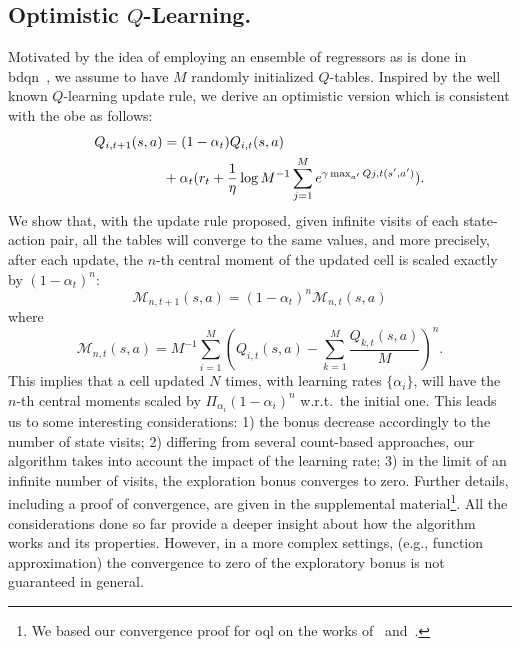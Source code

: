\subsection{Optimistic $Q$-Learning.}
Motivated by the idea of employing an ensemble of regressors as is done in \gls{bdqn}~\cite{osband2017deep}, we assume to have $M$ randomly initialized $Q$-tables. Inspired by the well known $Q$-learning update rule, we derive an optimistic version which is consistent with the \gls{obe} as follows:
\begin{align*}
      \small  Q_{i, t+1}(s,a) &= (1-\alpha_t)Q_{i,t}(s,a)  \nonumber  \\
  & \small + \alpha_t (r_t + \frac{1}{\eta} \log M^{-1} \sum_{j=1}^M e^{\gamma \max_{a'} Q{j,t}(s', a')}).\nonumber
\end{align*}
\label{def:optimistic_qlearning}
We show that, with the update rule proposed, given infinite visits of each state-action pair, all the tables will converge to the same values, and more precisely, after each update, the $n$-th central moment of the updated cell is scaled exactly by $(1 - \alpha_t)^n$:
\begin{equation}
	\mathcal{M}_{n,t+1}(s,a) = (1-\alpha_t)^n \mathcal{M}_{n,t}(s,a) \label{momentdecreasing}
\end{equation}
where 
\begin{equation}
	\mathcal{M}_{n,t}(s,a) = M^{-1} \sum_{i=1}^M (Q_{i,t}(s,a) - \sum_{k=1}^M \frac{Q_{k,t}(s,a)}{M})^n. \nonumber
\end{equation}
This implies that a cell updated $N$ times, with learning rates $\{\alpha_i\}$, will have the $n$-th central moments scaled by $\Pi_{\alpha_i}(1-\alpha_i)^n$ w.r.t.\ the initial one. This leads us to some interesting considerations: 1) the bonus decrease accordingly to the number of state visits; 2) differing from several count-based approaches, our algorithm takes into account the impact of the learning rate; 3) in the limit of an infinite number of visits, the exploration bonus converges to zero.
Further details, including a proof of convergence, are given in the supplemental material\footnote{We based our convergence proof for \gls{oql} on the works of~\cite{melo2001convergence} and~\cite{jaakkola1994convergence}.}.
All the considerations done so far provide a deeper insight about how the algorithm works and its properties. However, in a more complex settings, (e.g., function approximation) the convergence to zero of the exploratory bonus is not guaranteed in general.

